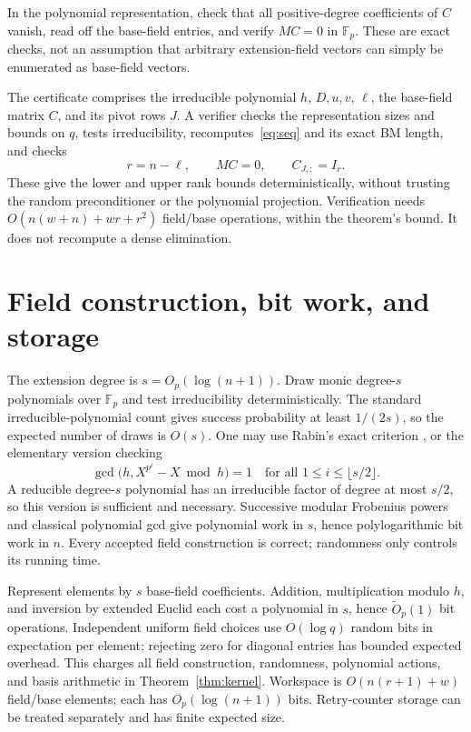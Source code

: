 \documentclass[11pt]{article}
\newcommand{\F}{\mathbb F}
\begin{document}
In the polynomial representation, check that all positive-degree
coefficients of $C$ vanish, read off the base-field entries, and
verify $MC=0$ in $\F_p$. These are exact checks, not an assumption
that arbitrary extension-field vectors can simply be enumerated as
base-field vectors.

The certificate comprises the irreducible polynomial $h$, $D,u,v$,
$\ell$, the base-field matrix $C$, and its pivot rows $J$.
A verifier checks the representation sizes and bounds on $q$, tests
irreducibility, recomputes~\eqref{eq:seq} and its exact BM length,
and checks
\[
 r=n-\ell,\qquad MC=0,\qquad C_{J,:}=I_r.
\]
These give the lower and upper rank bounds deterministically, without
trusting the random preconditioner or the polynomial projection.
Verification needs $O(n(w+n)+wr+r^2)$ field/base operations, within
the theorem's bound. It does not recompute a dense elimination.

\section{Field construction, bit work, and storage}
The extension degree is $s=O_p(\log(n+1))$. Draw monic degree-$s$
polynomials over $\F_p$ and test irreducibility deterministically.
The standard irreducible-polynomial count gives success probability
at least $1/(2s)$, so the expected number of draws is $O(s)$.
One may use Rabin's exact criterion \cite{rabin}, or the elementary
version checking
\[
 \gcd\bigl(h,X^{p^i}-X\bmod h\bigr)=1
 \quad\text{for all }1\le i\le\lfloor s/2\rfloor.
\]
A reducible degree-$s$ polynomial has an irreducible factor of degree
at most $s/2$, so this version is sufficient and necessary.
Successive modular Frobenius powers and classical polynomial gcd
give polynomial work in $s$, hence polylogarithmic bit work in $n$.
Every accepted field construction is correct; randomness only
controls its running time.

Represent elements by $s$ base-field coefficients. Addition,
multiplication modulo $h$, and inversion by extended Euclid each
cost a polynomial in $s$, hence $\widetilde O_p(1)$ bit operations.
Independent uniform field choices use $O(\log q)$ random bits in
expectation per element; rejecting zero for diagonal entries has
bounded expected overhead. This charges all field construction,
randomness, polynomial actions, and basis arithmetic in
Theorem~\ref{thm:kernel}. Workspace is $O(n(r+1)+w)$ field/base
elements; each has $O_p(\log(n+1))$ bits. Retry-counter storage can
be treated separately and has finite expected size.
\end{document}
